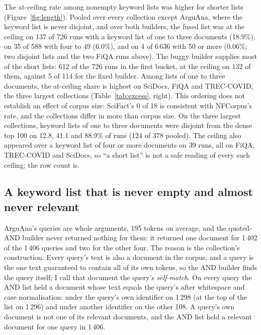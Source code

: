\documentclass[11pt]{article}
\begin{document}
The at-ceiling rate among nonempty keyword lists was higher for shorter lists (Figure~\ref{fig:length}). Pooled over every collection except ArguAna, where the keyword list is never disjoint, and over both builders, the fused list was at the ceiling on 137 of 726 runs with a keyword list of one to three documents (18.9\%), on 35 of 588 with four to 49 (6.0\%), and on 4 of 6\,636 with 50 or more (0.06\%; two disjoint lists and the two FiQA runs above). The buggy builder supplies most of the short lists: 612 of the 726 runs in the first bucket, at the ceiling on 132 of them, against 5 of 114 for the fixed builder. Among lists of one to three documents, the at-ceiling share is highest on SciDocs, FiQA and TREC-COVID, the three largest collections (Table~\ref{tab:excess}, right). This ordering does not establish an effect of corpus size: SciFact's 0 of 18 is consistent with NFCorpus's rate, and the collections differ in more than corpus size. On the three largest collections, keyword lists of one to three documents were disjoint from the dense top 100 on 12.8, 41.1 and 88.9\% of runs (124 of 378 pooled). The ceiling also appeared over a keyword list of four or more documents on 39 runs, all on FiQA, TREC-COVID and SciDocs, so ``a short list'' is not a safe reading of every such ceiling; the row count is.

\subsection{A keyword list that is never empty and almost never relevant}
\label{sec:arguana}

ArguAna's queries are whole arguments, 195 tokens on average, and the quoted-AND builder never returned nothing for them: it returned one document for 1\,402 of the 1\,406 queries and two for the other four. The reason is the collection's construction. Every query's text is also a document in the corpus, and a query is the one text guaranteed to contain all of its own tokens, so the AND builder finds the query itself; I call that document the query's \emph{self-match}. On every query the AND list held a document whose text equals the query's after whitespace and case normalisation: under the query's own identifier on 1\,298 (at the top of the list on 1\,296) and under another identifier on the other 108. A query's own document is not one of its relevant documents, and the AND list held a relevant document for one query in 1\,406.
\end{document}
